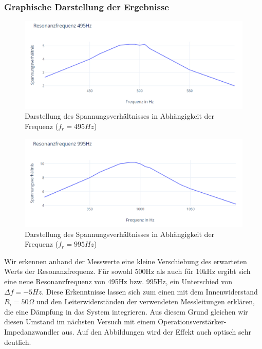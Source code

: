 \documentclass{article}
\begin{document}
\subsubsection{Graphische Darstellung der Ergebnisse}
\begin{figure}[h]
  \begin{center}
    \includegraphics[scale=0.75]{../assets/images/ETP3/Fre495Plot1.PNG}
    \caption{Darstellung des Spannungsverhältnisses in Abhängigkeit der Frequenz ($f_r = 495Hz$)}
  \end{center}
\end{figure}

\begin{figure}[h]
  \begin{center}
    \includegraphics[scale=0.75]{../assets/images/ETP3/Fre995Plot2.PNG}
    \caption{Darstellung des Spannungsverhältnisses in Abhängigkeit der Frequenz ($f_r = 995Hz$)}
  \end{center}
\end{figure}

Wir erkennen anhand der Messwerte eine kleine Verschiebung des erwarteten Werts der Resonanzfrequenz. Für sowohl 500Hz als auch für 10kHz
ergibt sich eine neue Resonanzfrequenz von 495Hz bzw. 995Hz, ein Unterschied von $\Delta f = -5Hz$. Diese Erkenntnisse lassen sich zum einen
mit dem Innenwiderstand $R_i = 50\Omega$ und den Leiterwiderständen der verwendeten Messleitungen erklären, die eine Dämpfung in das System integrieren.
Aus diesem Grund gleichen wir diesen Umstand im nächsten Versuch mit einem Operationsverstärker-Impedanzwandler aus. Auf den Abbildungen wird der Effekt auch
optisch sehr deutlich.
\newpage
\end{document}
